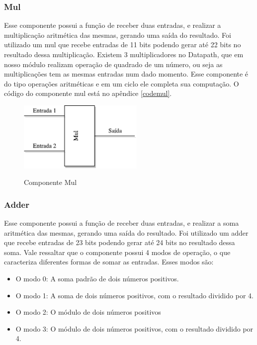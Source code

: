 \subsubsection{Mul}
Esse componente possui a função de receber duas entradas, e realizar a multiplicação aritmética das mesmas, gerando uma saída do resultado. Foi utilizado um mul que recebe entradas de 11 bits podendo gerar até 22 bits no resultado dessa multiplicação. Existem 3 multiplicadores no Datapath, que em nosso módulo realizam operação de quadrado de um número, ou seja as multiplicações tem as mesmas entradas num dado momento. Esse componente é do tipo operações aritméticas e em um ciclo ele completa sua computação. O código do componente mul está no apêndice \ref{codemul}.

\begin{figure}[H]
	\centering
	\includegraphics[width=6cm]{figures/Mul.pdf}\\
	\caption{Componente Mul}
	\label{Mul}
\end{figure}



\subsubsection{Adder}
Esse componente possui a função de receber duas entradas, e realizar a soma aritmética das mesmas, gerando uma saída do resultado. Foi utilizado um adder que recebe entradas de 23 bits podendo gerar até 24 bits no resultado dessa soma. Vale ressaltar que o componente possui 4 modos de operação, o que caracteriza diferentes formas de somar as entradas. Esses modos são:
\begin{itemize}
	\item O modo 0: A soma padrão de dois números positivos.
	\item O modo 1: A soma de dois números positivos, com o resultado dividido por 4.
	\item O modo 2: O módulo de dois números positivos
	\item O modo 3: O módulo de dois números positivos, com o resultado dividido por 4.
\end{itemize}

